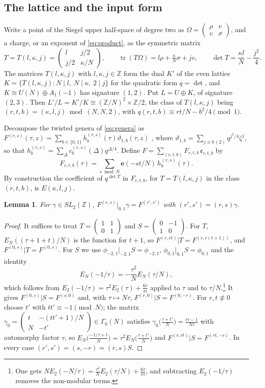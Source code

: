\documentclass[11pt]{amsart}
\numberwithin{equation}{section}
\theoremstyle{plain}
\newtheorem{lem}[thm]{Lemma}
\theoremstyle{definition}
\theoremstyle{remark}
\newcommand{\Z}{\mathbb{Z}}
\newcommand{\e}{\mathbf{e}}
\newcommand{\pmi}{\phi_{-2,1}}
\newcommand{\pz}{\phi_{0,1}}
\newcommand{\sm}[4]{\left(\begin{smallmatrix}#1&#2\\#3&#4\end{smallmatrix}\right)}
\begin{document}
\subsection{The lattice and the input form}
Write a point of the Siegel upper half-space of degree two as $\Omega=\sm\rho vv\sigma$, and a charge, or an exponent of \eqref{eq:product}, as the symmetric matrix
\[
T=T(l,\kappa,j)=\begin{pmatrix}l&j/2\\ j/2&\kappa/N\end{pmatrix},\qquad \operatorname{tr}(T\Omega)=l\rho+\tfrac{\kappa}{N}\sigma+jv,\qquad \det T=\frac{\kappa l}N-\frac{j^2}4 .
\]
The matrices $T(l,\kappa,j)$ with $l,\kappa,j\in\Z$ form the dual $K'$ of the even lattice $K=\{T(l,\kappa,j):N\mid l,\ N\mid\kappa,\ 2\mid j\}$ for the quadratic form $q=\det$, and $K\cong U(N)\oplus A_1(-1)$ has signature $(1,2)$. Put $L=U\oplus K$, of signature $(2,3)$. Then $L'/L=K'/K\cong(\Z/N)^2\times\Z/2$, the class of $T(l,\kappa,j)$ being $(r,t,b)=(\kappa,l,j)\bmod(N,N,2)$, with $q(r,t,b)\equiv rt/N-b^2/4\pmod1$.

Decompose the twisted genera of \eqref{eq:genera} as $F^{(r,s)}(\tau,z)=\sum_{b\in\{0,1\}}h^{(r,s)}_b(\tau)\vartheta_{1,b}(\tau,z)$ \cite[\S5]{EZ85}, where $\vartheta_{1,b}=\sum_{j\equiv b\,(2)}q^{j^2/4}\zeta^j$, so that $h^{(r,s)}_b=\sum_\Delta c^{(r,s)}_b(\Delta)q^{\Delta/4}$. Define $F=\sum_{(r,t,b)}F_{r,t,b}\,\mathfrak e_{r,t,b}$ by
\[
F_{r,t,b}(\tau)=\sum_{s\bmod N}\e(-st/N)\,h^{(r,s)}_b(\tau).
\]
By construction the coefficient of $q^{\det T}$ in $F_{r,t,b}$, for $T=T(l,\kappa,j)$ in the class $(r,t,b)$, is $E(\kappa,l,j)$.

\begin{lem}\label{lem:cov}
For $\gamma\in SL_2(\Z)$, $F^{(r,s)}|_{0,1}\gamma=F^{(r',s')}$ with $(r',s')=(r,s)\gamma$.
\end{lem}

\begin{proof}
It suffices to treat $T=\sm1101$ and $S=\sm0{-1}10$. For $T$, $E_N((\tau+1+t)/N)$ is the function for $t+1$, so $F^{(r,rt)}|T=F^{(r,r(t+1))}$, and $F^{(0,s)}|T=F^{(0,s)}$. For $S$ we use $\pmi|_{-2,1}S=\pmi$, $\pz|_{0,1}S=\pz$ and the identity
\[
E_N(-1/\tau)=-\frac{\tau^2}{N}E_N(\tau/N),
\]
which follows from $E_2(-1/\tau)=\tau^2E_2(\tau)+\frac{6\tau}{\pi i}$ applied to $\tau$ and to $\tau/N$.\footnote{One gets $NE_2(-N/\tau)=\frac{\tau^2}NE_2(\tau/N)+\frac{6\tau}{\pi i}$, and subtracting $E_2(-1/\tau)$ removes the non-modular terms.} It gives $F^{(0,s)}|S=F^{(s,0)}$ and, with $\tau\mapsto N\tau$, $F^{(r,0)}|S=F^{(0,-r)}$. For $r,t\not\equiv0$ choose $t'$ with $tt'\equiv-1\pmod N$; the matrix $\gamma_0=\sm{t}{-(tt'+1)/N}{N}{-t'}\in\Gamma_0(N)$ satisfies $\gamma_0\bigl(\frac{\tau+t'}N\bigr)=\frac{t\tau-1}{N\tau}$ with automorphy factor $\tau$, so $E_N\bigl(\frac{-1/\tau+t}N\bigr)=\tau^2E_N\bigl(\frac{\tau+t'}N\bigr)$ and $F^{(r,rt)}|S=F^{(rt,-r)}$. In every case $(r',s')=(s,-r)=(r,s)S$.
\end{proof}
\end{document}
